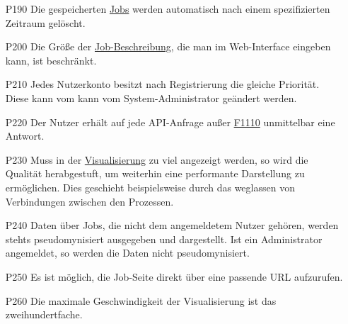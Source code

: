 \begin{itemize}[noitemsep]
    \item[P190] Die gespeicherten \hyperref[B:Jobs]{Jobs} werden automatisch nach einem spezifizierten Zeitraum gelöscht.

    \item[P200] Die Größe der \hyperref[B:Job-Beschreibung]{Job-Beschreibung}, die man im Web-Interface eingeben kann, ist beschränkt.

    
    \item[P210] Jedes \gls{Nutzerkonto} besitzt nach Registrierung die gleiche Priorität. Diese kann vom kann vom \gls{System-Administrator} geändert werden.
    
    
    \item[P220] Der \gls{Nutzer} erhält auf jede \gls{API}-Anfrage außer \hyperref[FA:API:Andauernde Abfrage des Ergebnisses eines Jobs]{F1110} unmittelbar eine  Antwort.
    
    \item[P230] Muss in der \hyperref[pages:visualization]{Visualisierung} zu viel angezeigt werden, so wird die Qualität herabgestuft, um weiterhin eine performante Darstellung zu ermöglichen. Dies geschieht beispielsweise durch das weglassen von Verbindungen zwischen den Prozessen.
    
    \item[P240] Daten über Jobs, die nicht dem angemeldetem Nutzer gehören, werden stehts pseudomynisiert ausgegeben und dargestellt. Ist ein Administrator  angemeldet, so werden die Daten nicht pseudomynisiert.
    
    \item[P250] Es ist möglich, die Job-Seite direkt über eine passende \gls{URL} aufzurufen.
    
    \item[P260] Die maximale Geschwindigkeit der Visualisierung ist das zweihundertfache.

    
\end{itemize}